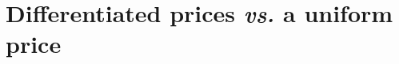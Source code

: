 \documentclass[aspectratio=169,xcolor=dvipsnames, 11pt,mathserif]{beamer}
\begin{document}


\section{Differentiated prices \textit{vs.} a uniform price}
\end{document}
